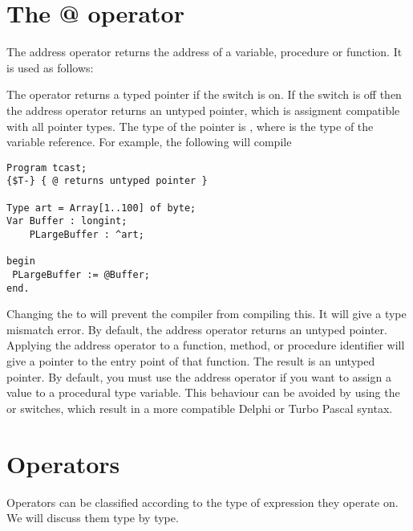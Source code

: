 \documentclass{report}
\begin{document}
\section{The @ operator}
The address operator  returns the address of a variable, procedure
or function. It is used as follows:

The  operator returns a typed pointer if the  switch is on.
If the  switch is off then the address operator returns an untyped
pointer, which is assigment compatible with all pointer types. The type of
the pointer is , where  is the type of the variable
reference.
For example, the following will compile
\begin{verbatim}
Program tcast;
{$T-} { @ returns untyped pointer }

Type art = Array[1..100] of byte;
Var Buffer : longint;
    PLargeBuffer : ^art;

begin
 PLargeBuffer := @Buffer;
end.
\end{verbatim}
Changing the  to  will prevent the compiler from
compiling this. It will give a type mismatch error.
By default, the address operator returns an untyped pointer.
Applying the address operator to a function, method, or procedure identifier
will give a pointer to the entry point of that function. The result is an
untyped pointer.
By default, you must use the address operator if you want to assign a value
to a procedural type variable. This behaviour can be avoided by using the
 or  switches, which result in a more compatible Delphi or
Turbo Pascal syntax.
\section{Operators}
Operators can be classified according to the type of expression they
operate on. We will discuss them type by type.
\end{document}
